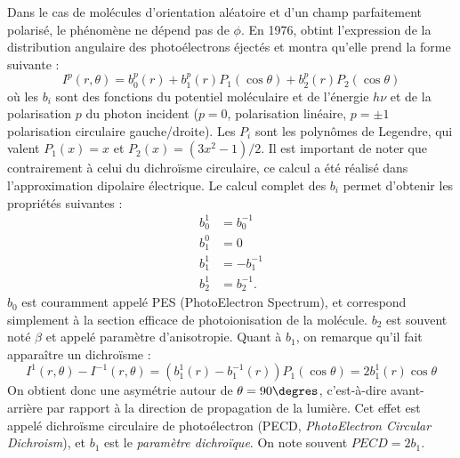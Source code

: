 Dans le cas de molécules d'orientation aléatoire et d'un champ parfaitement polarisé, le phénomène ne dépend pas de $\phi$. En 1976,  obtint l'expression de la distribution angulaire des photoélectrons éjectés et montra qu'elle prend la forme suivante :
\begin{equation}
I^p(r,\theta) = b_0^p(r) + b_1^p(r) P_1(\cos\theta) + b_2^p(r) P_2(\cos\theta)
\label{eq:angulardistrib}
\end{equation}
où les $b_i$ sont des fonctions du potentiel moléculaire et de l'énergie $h\nu$ et de la polarisation $p$ du photon incident ($p = 0$, polarisation linéaire, $p =\pm1$ polarisation circulaire gauche/droite). Les $P_i$ sont les polynômes de Legendre, qui valent $P_1(x) = x$ et $P_2(x) = (3x^2-1)/2$. Il est important de noter que contrairement à celui du dichroïsme circulaire, ce calcul a été réalisé dans l'approximation dipolaire électrique. Le calcul complet des $b_i$ permet d'obtenir les propriétés suivantes :
\begin{align}
b_0^1 &= b_0^{-1} \nonumber\\
b_1^0 &= 0\nonumber\\
b_1^1 &= -b_1^{-1}\nonumber\\
b_2^1 &= b_2^{-1}.
\label{eq:bi}
\end{align}
$b_0$ est couramment appelé PES (PhotoElectron Spectrum), et correspond simplement à la section efficace de photoionisation de la molécule. $b_2$ est souvent noté $\beta$ et appelé paramètre d'anisotropie. Quant à $b_1$, on remarque qu'il fait apparaître un dichroïsme :
\begin{equation}
I^{1}(r,\theta)-I^{-1}(r,\theta) = (b_1^1(r)-b_1^{-1}(r))P_1(\cos\theta) = 2b_1^1(r)\cos\theta
\label{eq:pecddef}
\end{equation}
On obtient donc une asymétrie autour de $\theta = 90\degres$, c'est-à-dire avant-arrière par rapport à la direction de propagation de la lumière. Cet effet est appelé dichroïsme circulaire de photoélectron (PECD, \textit{PhotoElectron Circular Dichroism}), et $b_1$ est le \textit{paramètre dichroïque}. On note souvent $PECD = 2b_1$.

